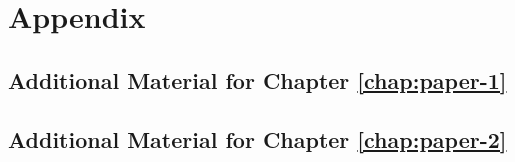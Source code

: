 \part{Appendix}\label{part:appendix}

\setchapterpreamble[u]{\margintoc}
\chapter{Additional Material for Chapter \ref{chap:paper-1}}


\setchapterpreamble[u]{\margintoc}
\chapter{Additional Material for Chapter \ref{chap:paper-2}}



\backmatter%





